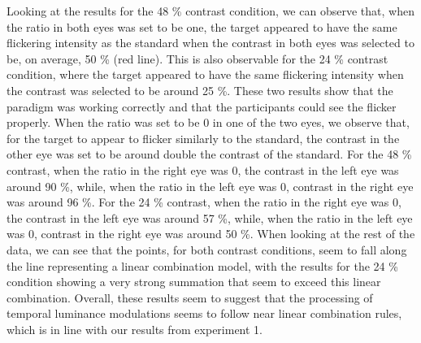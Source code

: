 \documentclass[
]{article}
\begin{document}
Looking at the results for the 48 \% contrast condition, we can observe that, when the ratio in both eyes was set to be one, the target appeared to have the same flickering intensity as the standard when the contrast in both eyes was selected to be, on average, 50 \% (red line). This is also observable for the 24 \% contrast condition, where the target appeared to have the same flickering intensity when the contrast was selected to be around 25 \%. These two results show that the paradigm was working correctly and that the participants could see the flicker properly.
When the ratio was set to be 0 in one of the two eyes, we observe that, for the target to appear to flicker similarly to the standard, the contrast in the other eye was set to be around double the contrast of the standard. For the 48 \% contrast, when the ratio in the right eye was 0, the contrast in the left eye was around 90 \%, while, when the ratio in the left eye was 0, contrast in the right eye was around 96 \%. For the 24 \% contrast, when the ratio in the right eye was 0, the contrast in the left eye was around 57 \%, while, when the ratio in the left eye was 0, contrast in the right eye was around 50 \%. When looking at the rest of the data, we can see that the points, for both contrast conditions, seem to fall along the line representing a linear combination model, with the results for the 24 \% condition showing a very strong summation that seem to exceed this linear combination. Overall, these results seem to suggest that the processing of temporal luminance modulations seems to follow near linear combination rules, which is in line with our results from experiment 1.
\end{document}
